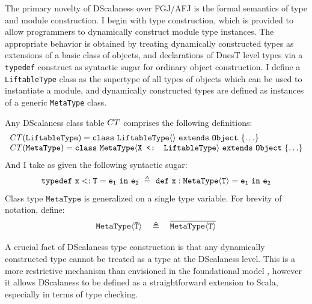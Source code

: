 The primary novelty of DScalaness over FGJ/AFJ is the formal semantics of type and module
construction. I begin with type construction, which is provided to allow programmers to
dynamically construct module type instances. The appropriate behavior is obtained by treating
dynamically constructed types as extensions of a basic class of objects, and declarations of
DnesT level types via a \texttt{typedef} construct as syntactic sugar for ordinary object
construction. I define a \texttt{LiftableType} class as the supertype of all types of objects
which can be used to instantiate a module, and dynamically constructed types are defined as
instances of a generic \texttt{MetaType} class.
\begin{definition}
\label{definition-classtable}
Any DScalaness class table ${CT}$ comprises the following definitions:
$$
\begin{array}{l}
{CT}(\texttt{LiftableType}) = \mathtt{class\ \texttt{LiftableType}\langle \rangle\ extends\ Object\ \{\ldots \}}\\
{CT}(\texttt{MetaType}) = \mathtt{class\ \texttt{MetaType}\langle \texttt{X <: LiftableType}\rangle\ extends\ Object\ \{ \ldots  \}}
\end{array}
$$
And I take as given the following syntactic sugar:
$$
\jtlet{x}{T}{e_1}{e_2}\ \defeq\ \jdef{x}{\jinst{MetaType}{T}}{e_1}{e_2}
$$
Class type $\texttt{MetaType}$ is generalized on a single type variable. For brevity of
notation, define:
$$
\mathtt{\texttt{MetaType}\langle {\ensuremath{\mathtt{\bar{T}}}} \rangle}\quad \triangleq \quad \overline{\mathtt{MetaType\langle T \rangle}}
$$
\end{definition}
A crucial fact of DScalaness type construction is that any dynamically constructed type cannot be
treated as a type at the DScalaness level. This is a more restrictive mechanism than envisioned
in the foundational model \cite{FramedML,FramedMLworkshop}, however it allows DScalaness to be
defined as a straightforward extension to Scala, especially in terms of type checking.

